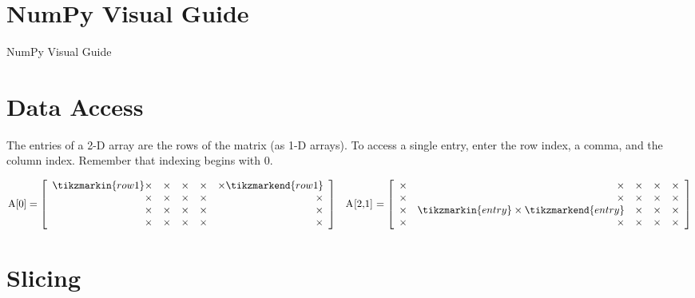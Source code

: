 \section{NumPy Visual Guide}{NumPy Visual Guide}
\label{appendix:numpy-visual-guide}

\section*{Data Access} %

The entries of a 2-D array are the rows of the matrix (as 1-D arrays).
To access a single entry, enter the row index, a comma, and the column index.
Remember that indexing begins with $0$.

\begin{align*}
\text{\li{A[0]}} = \left[\begin{array}{rrrrr}
\tikzmarkin{row1}\times & \times & \times & \times & \times\tikzmarkend{row1}\\
\times & \times & \times & \times & \times\\
\times & \times & \times & \times & \times\\
\times & \times & \times & \times & \times\\
\end{array}\right]
&&
\text{\li{A[2,1]}} = \left[\begin{array}{rrrrr}
\times & \times & \times & \times & \times\\
\times & \times & \times & \times & \times\\
\times & \tikzmarkin{entry} \times \tikzmarkend{entry} & \times & \times & \times\\
\times & \times & \times & \times & \times
\end{array}\right]
\end{align*}

\section*{Slicing} %

